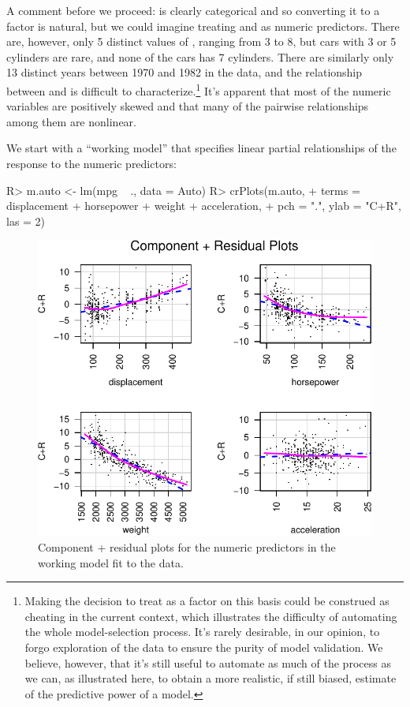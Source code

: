 \documentclass[
]{jss}
\begin{document}
A comment before we proceed:  is clearly categorical and so
converting it to a factor is natural, but we could imagine treating
 and  as numeric predictors. There are,
however, only 5 distinct values of , ranging from 3 to
8, but cars with 3 or 5 cylinders are rare, and none of the cars has 7
cylinders. There are similarly only 13 distinct years between 1970 and
1982 in the data, and the relationship between  and
 is difficult to characterize.\footnote{Making the decision
  to treat  as a factor on this basis could be construed as
  cheating in the current context, which illustrates the difficulty of
  automating the whole model-selection process. It's rarely desirable,
  in our opinion, to forgo exploration of the data to ensure the purity
  of model validation. We believe, however, that it's still useful to
  automate as much of the process as we can, as illustrated here, to
  obtain a more realistic, if still biased, estimate of the predictive
  power of a model.} It's apparent that most of the numeric variables
are positively skewed and that many of the pairwise relationships among
them are nonlinear.

We start with a ``working model'' that specifies linear partial
relationships of the response to the numeric predictors:

\begin{CodeChunk}
\begin{CodeInput}
R> m.auto <- lm(mpg ~ ., data = Auto)
R> crPlots(m.auto,
+         terms = ~ displacement + horsepower + weight + acceleration,
+         pch = ".", ylab = "C+R", las = 2)
\end{CodeInput}
\begin{figure}

{\centering \includegraphics[width=0.7\linewidth]{Figures/Auto-explore-cr-plots-1}

}

\caption[Component + residual plots for the numeric predictors in the working model fit to the  data]{Component + residual plots for the numeric predictors in the working model fit to the  data.}\label{fig:Auto-explore-cr-plots}
\end{figure}
\end{CodeChunk}
\end{document}
